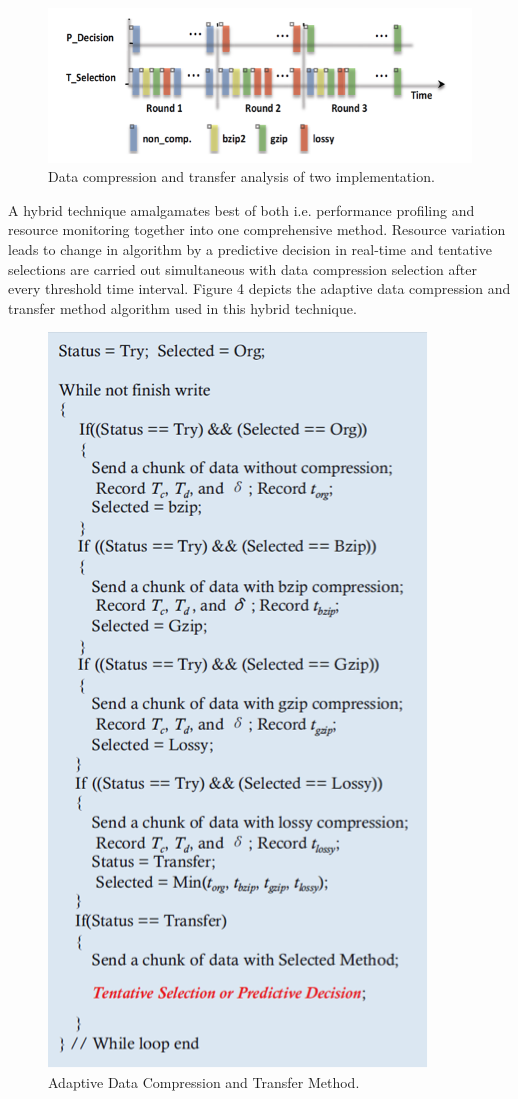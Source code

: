 \documentclass[runningheads,a4paper]{llncs}
\begin{document}
{\begin{figure}[!htb]
	\includegraphics[scale=0.7]{./images/krunal9}
	\centering
	\caption{Data compression and transfer analysis of two implementation.}
	\label{fig:krunal9}
\end{figure}

A hybrid technique amalgamates best of both i.e. performance profiling and resource monitoring together into one comprehensive method. Resource variation leads to change in algorithm by a predictive decision in real-time and tentative selections are carried out simultaneous with data compression selection after every threshold time interval. Figure 4 depicts the adaptive data compression and transfer method algorithm used in this hybrid technique.
\begin{figure}[!htb]
	\includegraphics[scale=0.7]{./images/krunal10}
	\centering
	\caption{Adaptive Data Compression and Transfer Method.}
	\label{fig:krunal10}
\end{figure}
\newpage
}
\end{document}
